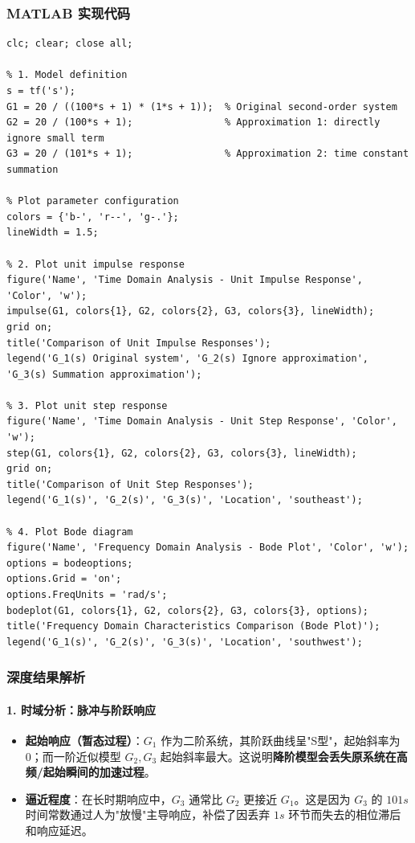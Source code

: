 \documentclass{article}
\begin{document}
\subsubsection*{MATLAB 实现代码}
\begin{lstlisting}[caption={MATLAB Code for Control System Model Order Reduction Analysis}, label={lst:code2}]
%% Control system model order reduction simulation analysis
clc; clear; close all;

% 1. Model definition
s = tf('s');
G1 = 20 / ((100*s + 1) * (1*s + 1));  % Original second-order system
G2 = 20 / (100*s + 1);                % Approximation 1: directly ignore small term
G3 = 20 / (101*s + 1);                % Approximation 2: time constant summation

% Plot parameter configuration
colors = {'b-', 'r--', 'g-.'};
lineWidth = 1.5;

% 2. Plot unit impulse response
figure('Name', 'Time Domain Analysis - Unit Impulse Response', 'Color', 'w');
impulse(G1, colors{1}, G2, colors{2}, G3, colors{3}, lineWidth);
grid on;
title('Comparison of Unit Impulse Responses');
legend('G_1(s) Original system', 'G_2(s) Ignore approximation', 'G_3(s) Summation approximation');

% 3. Plot unit step response
figure('Name', 'Time Domain Analysis - Unit Step Response', 'Color', 'w');
step(G1, colors{1}, G2, colors{2}, G3, colors{3}, lineWidth);
grid on;
title('Comparison of Unit Step Responses');
legend('G_1(s)', 'G_2(s)', 'G_3(s)', 'Location', 'southeast');

% 4. Plot Bode diagram
figure('Name', 'Frequency Domain Analysis - Bode Plot', 'Color', 'w');
options = bodeoptions;
options.Grid = 'on';
options.FreqUnits = 'rad/s';
bodeplot(G1, colors{1}, G2, colors{2}, G3, colors{3}, options);
title('Frequency Domain Characteristics Comparison (Bode Plot)');
legend('G_1(s)', 'G_2(s)', 'G_3(s)', 'Location', 'southwest');
\end{lstlisting}

\subsubsection*{深度结果解析}
\paragraph{1. 时域分析：脉冲与阶跃响应}
\begin{itemize}
    \item \textbf{起始响应（暂态过程）}：$G_1$ 作为二阶系统，其阶跃曲线呈"S型"，起始斜率为 0；而一阶近似模型 $G_2, G_3$ 起始斜率最大。这说明\textbf{降阶模型会丢失原系统在高频/起始瞬间的加速过程}。
    \item \textbf{逼近程度}：在长时期响应中，$G_3$ 通常比 $G_2$ 更接近 $G_1$。这是因为 $G_3$ 的 $101s$ 时间常数通过人为"放慢"主导响应，补偿了因丢弃 $1s$ 环节而失去的相位滞后和响应延迟。
\end{itemize}
\end{document}
